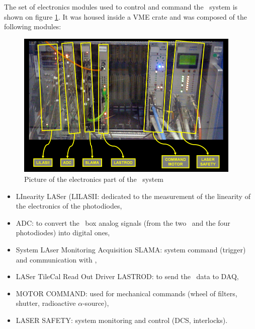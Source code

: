 \begin{itemize}
	The set of electronics modules used to control and command the \lasa~system is shown on figure \ref{fig:lasaelectronics}. It was housed inside a VME crate and was composed of the following modules:
	\begin{figure}[htbp]
			\centering
			\includegraphics[height=7cm]{figures/Electronics.png}
			\caption{Picture of the electronics part of the \lasi~system}\label{fig:lasaelectronics}
		\end{figure}	
		
	\begin{itemize}
	\item LInearity LASer {\sc (LILASII}: dedicated to the measurement of the linearity of the electronics of the photodiodes,
	\item {\sc ADC}: to convert the \las~box analog signals (from the two \pmts~and the four photodiodes) into digital ones,
	\item System LAser Monitoring Acquisition {\sc SLAMA}: system command (trigger) and communication with \atlas,
	\item LASer TileCal Read Out Driver {\sc LASTROD}: to send the \las~data to \atlas DAQ,
	\item {\sc MOTOR COMMAND}: used for mechanical commands (wheel of filters, shutter, radioactive $\alpha$-source),
	\item LASER SAFETY: system monitoring and control (DCS, interlocks).
	\end{itemize}
	
\end{itemize}



